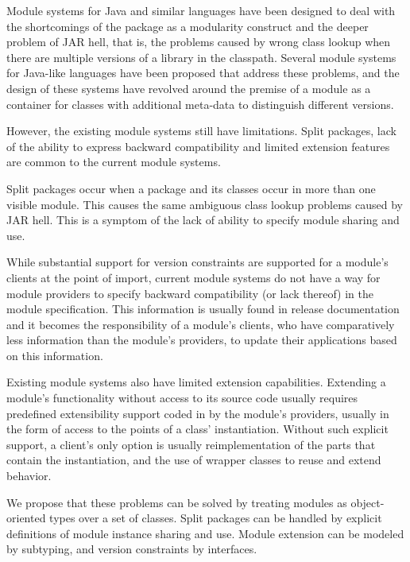 Module systems for Java and similar languages have been designed 
to deal with the shortcomings of the package as a modularity construct
and the deeper problem of JAR hell, that is, the problems caused
by wrong class lookup when there are multiple versions of a library
in the classpath. Several module systems for Java-like languages 
have been proposed \cite{javajars, OSGi4, netassemblies, JSR294, JSR277}
that address these problems, and the design of these systems have
revolved around the premise of a module as a container for classes
with additional meta-data to distinguish different versions.

However, the existing module systems still have limitations. Split packages, lack of
the ability to express backward compatibility and limited extension
features are common to the current module systems.

Split packages \cite{iJAMComments} occur when 
a package and its classes occur in more than one visible module. This
causes the same ambiguous class lookup problems caused by JAR hell.
This is a symptom of the lack of ability to specify module sharing
and use.

While substantial support for version constraints are supported
for a module's clients at the point of import, current module 
systems do not have a way for module providers to specify backward 
compatibility (or lack thereof) in the module specification. 
This information is usually found in release documentation and 
it becomes the responsibility of a module's clients, who have comparatively
less information than the module's providers, to update 
their applications based on this information. 

Existing module systems also have limited extension capabilities. Extending
a module's functionality without access to its source code usually 
requires predefined extensibility support coded in by the module's 
providers, usually in the form of access to the points of a class' 
instantiation. Without such explicit support, a client's only option
is usually reimplementation of the parts that contain the instantiation, 
and the use of wrapper classes to reuse and extend behavior.

We propose that these problems can be solved by treating modules
as object-oriented types over a set of classes. Split packages can 
be handled by explicit definitions of module instance sharing and use.
Module extension can be modeled by subtyping, and version constraints
by interfaces. 

